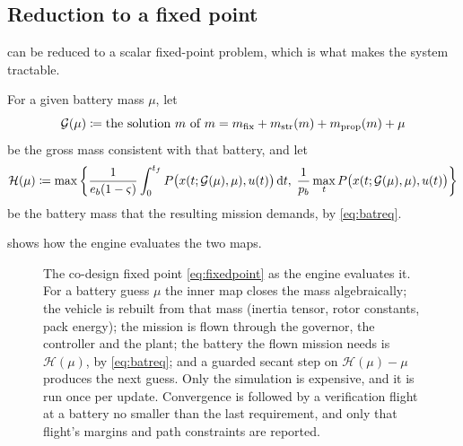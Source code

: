 \subsection{Reduction to a fixed point}

 can be reduced to a scalar fixed-point problem, which is
what makes the system tractable.

\begin{definition}
For a given battery mass $\mu$, let
\begin{equation}
  \mathcal{G}(\mu) \coloneqq \text{the solution } m \text{ of }
  m = m_{\mathrm{fix}} + m_{\mathrm{str}}(m) + m_{\mathrm{prop}}(m) + \mu
  \label{eq:innermap}
\end{equation}
be the gross mass consistent with that battery, and let
\begin{equation}
  \mathcal{H}(\mu) \coloneqq
  \max\left\{
  \frac{1}{e_b(1-\varsigma)}\int_0^{t_f}
    P\big(x(t;\mathcal{G}(\mu),\mu),u(t)\big)\,\mathrm{d} t,\;
  \frac{1}{p_b}\max_t P\big(x(t;\mathcal{G}(\mu),\mu),u(t)\big)\right\}
  \label{eq:outermap}
\end{equation}
be the battery mass that the resulting mission demands, by \cref{eq:batreq}.
\end{definition}

 shows how the engine evaluates the two maps.

\begin{figure}[tbp]
\centering

\caption{The co-design fixed point \cref{eq:fixedpoint} as the engine evaluates
it. For a battery guess $\mu$ the inner map closes the mass algebraically; the
vehicle is rebuilt from that mass (inertia tensor, rotor constants, pack
energy); the mission is flown through the governor, the controller and the
plant; the battery the flown mission needs is $\mathcal H(\mu)$, by
\cref{eq:batreq}; and a guarded secant step on $\mathcal H(\mu)-\mu$ produces
the next guess. Only the simulation is expensive, and it is run once per
update. Convergence is followed by a verification flight at a battery no
smaller than the last requirement, and only that flight's margins and path
constraints are reported.}
\label{fig:codesignblocks}
\end{figure}

